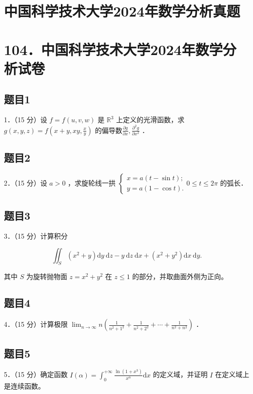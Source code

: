 \documentclass{article}
\begin{document}
\section*{中国科学技术大学2024年数学分析真题}
\section*{104．中国科学技术大学2024年数学分析试卷}

\subsection{题目1}
1．（15 分）设 \(f=f(u, v, w)\) 是 \(\mathbb{R}^{3}\) 上定义的光滑函数，求 \(g(x, y, z)=f\left(x+y, x y, \frac{x}{y}\right)\) 的偏导数\(\frac{\partial g}{\partial x}, \frac{\partial^{2} g}{\partial x^{2}}\) ．

\subsection{题目2}
2．（15 分）设 \(a>0\) ，求旋轮线一拱 \(\left\{\begin{array}{l}x=a(t-\sin t) ; \\ y=a(1-\cos t) .\end{array} 0 \leq t \leq 2 \pi\right.\) 的弧长．

\subsection{题目3}
3．（15 分）计算积分

\[
\iint_{S}\left(x^{2}+y\right) \mathrm{d} y \mathrm{~d} z-y \mathrm{~d} z \mathrm{~d} x+\left(x^{2}+y^{2}\right) \mathrm{d} x \mathrm{~d} y .
\]

其中 \(S\) 为旋转抛物面 \(z=x^{2}+y^{2}\) 在 \(z \leq 1\) 的部分，并取曲面外侧为正向。

\subsection{题目4}
4．（15 分）计算极限 \(\lim _{n \rightarrow \infty} n\left(\frac{1}{n^{2}+1^{2}}+\frac{1}{n^{2}+2^{2}}+\cdots+\frac{1}{n^{2}+n^{2}}\right)\) ．

\subsection{题目5}
5．（15 分）确定函数 \(I(\alpha)=\int_{0}^{+\infty} \frac{\ln \left(1+x^{3}\right)}{x^{\alpha}} \mathrm{d} x\) 的定义域，并证明 \(I\) 在定义域上是连续函数。
\end{document}
